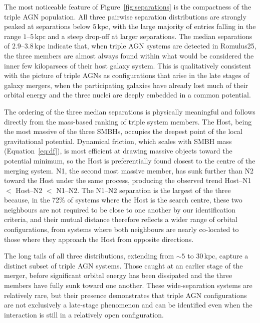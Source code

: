 \documentclass[twocolumn, 10pt]{article}
\begin{document}
The most noticeable feature of Figure~\ref{fig:separations} is the compactness of the triple AGN population. All three pairwise separation distributions are strongly peaked at separations below $5\,\mathrm{kpc}$, with the large majority of entries falling in the range $1$--$5\,\mathrm{kpc}$ and a steep drop-off at larger separations. The median separations of $2.9$--$3.8\,\mathrm{kpc}$ indicate that, when triple AGN systems are detected in Romulus25, the three members are almost always found within what would be considered the inner few kiloparsecs of their host galaxy system. This is qualitatively consistent with the picture of triple AGNs as configurations that arise in the late stages of galaxy mergers, when the participating galaxies have already lost much of their orbital energy and the three nuclei are deeply embedded in a common potential.
 
The ordering of the three median separations is physically meaningful and follows directly from the mass-based ranking of triple system members. The Host, being the most massive of the three SMBHs, occupies the deepest point of the local gravitational potential. Dynamical friction, which scales with SMBH mass (Equation~\ref{eq:df}), is most efficient at drawing massive objects toward the potential minimum, so the Host is preferentially found closest to the centre of the merging system. N1, the second most massive member, has sunk further than N2 toward the Host under the same process, producing the observed trend Host--N1 $<$ Host--N2 $<$ N1--N2. The N1--N2 separation is the largest of the three because, in the 72\% of systems where the Host is the search centre, these two neighbours are not required to be close to one another by our identification criteria, and their mutual distance therefore reflects a wider range of orbital configurations, from systems where both neighbours are nearly co-located to those where they approach the Host from opposite directions.
 
The long tails of all three distributions, extending from $\sim 5$ to $30\,\mathrm{kpc}$, capture a distinct subset of triple AGN systems. Those caught at an earlier stage of the merger, before significant orbital energy has been dissipated and the three members have fully sunk toward one another. These wide-separation systems are relatively rare, but their presence demonstrates that triple AGN configurations are not exclusively a late-stage phenomenon and can be identified even when the interaction is still in a relatively open configuration.
 
\end{document}
